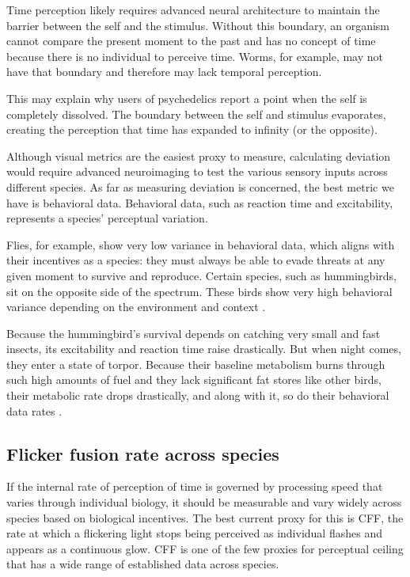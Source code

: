 \documentclass[11pt,a4paper]{article}
\begin{document}
Time perception likely requires advanced neural architecture to maintain the barrier between the self and the stimulus. Without this boundary, an organism cannot compare the present moment to the past and has no concept of time because there is no individual to perceive time. Worms, for example, may not have that boundary and therefore may lack temporal perception.

This may explain why users of psychedelics report a point when the self is completely dissolved. The boundary between the self and stimulus evaporates, creating the perception that time has expanded to infinity (or the opposite).

Although visual metrics are the easiest proxy to measure, calculating deviation would require advanced neuroimaging to test the various sensory inputs across different species. As far as measuring deviation is concerned, the best metric we have is behavioral data. Behavioral data, such as reaction time and excitability, represents a species' perceptual variation.

Flies, for example, show very low variance in behavioral data, which aligns with their incentives as a species: they must always be able to evade threats at any given moment to survive and reproduce. Certain species, such as hummingbirds, sit on the opposite side of the spectrum. These birds show very high behavioral variance depending on the environment and context \citep{gonzalezgomez2011flexibility}.

Because the hummingbird's survival depends on catching very small and fast insects, its excitability and reaction time raise drastically. But when night comes, they enter a state of torpor. Because their baseline metabolism burns through such high amounts of fuel and they lack significant fat stores like other birds, their metabolic rate drops drastically, and along with it, so do their behavioral data rates \citep{shankar2022heterothermic}.

\subsection{Flicker fusion rate across species}

If the internal rate of perception of time is governed by processing speed that varies through individual biology, it should be measurable and vary widely across species based on biological incentives. The best current proxy for this is CFF, the rate at which a flickering light stops being perceived as individual flashes and appears as a continuous glow. CFF is one of the few proxies for perceptual ceiling that has a wide range of established data across species.
\end{document}
